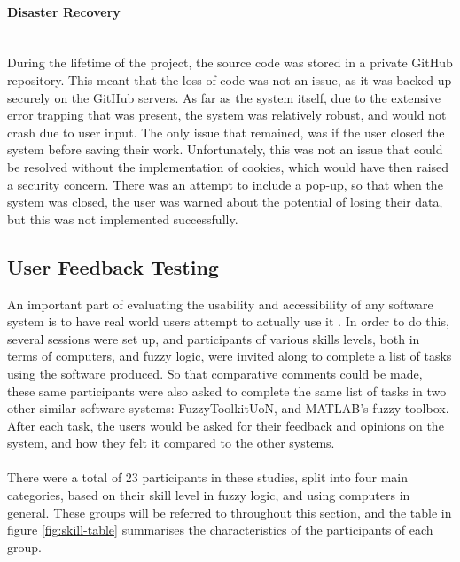 \paragraph{Disaster Recovery}\ \\
During the lifetime of the project, the source code was stored in a private GitHub repository. This meant that the loss of code was not an issue, as it was backed up securely on the GitHub servers. As far as the system itself, due to the extensive error trapping that was present, the system was relatively robust, and would not crash due to user input. The only issue that remained, was if the user closed the system before saving their work. Unfortunately, this was not an issue that could be resolved without the implementation of cookies, which would have then raised a security concern. There was an attempt to include a pop-up, so that when the system was closed, the user was warned about the potential of losing their data, but this was not implemented successfully. 

\subsection{User Feedback Testing}
\vspace{-2mm}
\label{sec:uft}
An important part of evaluating the usability and accessibility of any software system is to have real world users attempt to actually use it \cite{nielsen1992usability}. In order to do this, several sessions were set up, and participants of various skills levels, both in terms of computers, and fuzzy logic, were invited along to complete a list of tasks using the software produced. So that comparative comments could be made, these same participants were also asked to complete the same list of tasks in two other similar software systems: FuzzyToolkitUoN, and MATLAB's fuzzy toolbox. After each task, the users would be asked for their feedback and opinions on the system, and how they felt it compared to the other systems.\ \\
\ \\
There were a total of 23 participants in these studies, split into four main categories, based on their skill level in fuzzy logic, and using computers in general. These groups will be referred to throughout this section, and the table in figure \ref{fig:skill-table} summarises the characteristics of the participants of each group. 

